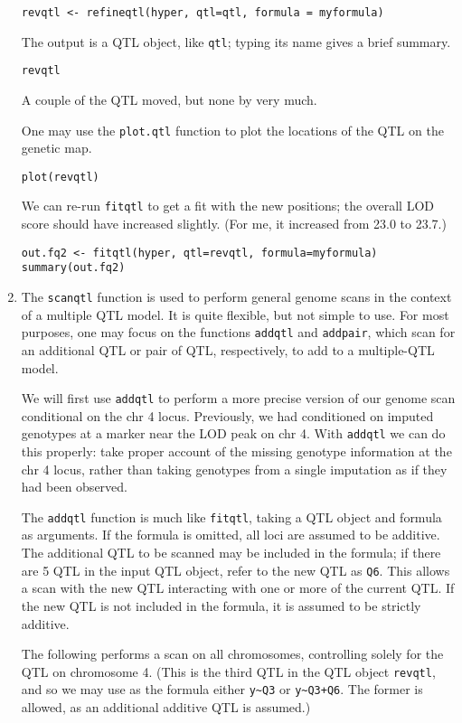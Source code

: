 \documentclass[10pt,letterpaper]{article}
\newcommand{\usercolor}{\color [named]{BlueViolet}}
\begin{document}
\begin{enumerate}
\usercolor
\verb|revqtl <- refineqtl(hyper, qtl=qtl, formula = myformula)|
\normalcolor

The output is a QTL object, like \verb-qtl-; typing its name gives a
brief summary.  

\usercolor \verb|revqtl| \normalcolor

A couple of the QTL moved, but none by very much.

One may use the \verb-plot.qtl- function to plot the
locations of the QTL on the genetic map.

\usercolor \verb|plot(revqtl)| \normalcolor

We can re-run \verb-fitqtl- to get a fit with the new positions; the
overall LOD score should have increased slightly.  (For me, it
increased from 23.0 to 23.7.)

\usercolor
\verb|out.fq2 <- fitqtl(hyper, qtl=revqtl, formula=myformula)| \\
\verb|summary(out.fq2)|
\normalcolor

\item The \verb-scanqtl- function is used to perform general genome
  scans in the context of a multiple QTL model.  It is quite flexible,
  but not simple to use.  For most purposes, one may focus on the
  functions \verb-addqtl- and \verb-addpair-, which scan for an
  additional QTL or pair of QTL, respectively, to add to a
  multiple-QTL model.

  We will first use \verb-addqtl- to perform a more precise version of
  our genome scan conditional on the chr 4 locus.  Previously, we had
  conditioned on imputed genotypes at a marker near the LOD peak on
  chr 4.  With \verb-addqtl- we can do this properly: take proper
  account of the missing genotype information at the chr 4 locus,
  rather than taking genotypes from a single imputation as if they had
  been observed.

  The \verb-addqtl- function is much like \verb-fitqtl-, taking a QTL
  object and formula as arguments.  If the formula is omitted,
  all loci are assumed to be additive.  The additional QTL to be
  scanned may be included in the formula; if there are 5 QTL in the
  input QTL object, refer to the new QTL as \verb-Q6-.  This allows a
  scan with the new QTL interacting with one or more of the current
  QTL.  If the new QTL is not included in the formula, it is assumed
  to be strictly additive.

  The following performs a scan on all chromosomes, controlling solely
  for the QTL on chromosome 4.  (This is the third QTL in the QTL
  object \verb-revqtl-, and so we may use as the formula either
  \verb-y~Q3- or \verb-y~Q3+Q6-.  The former is allowed, as an
  additional additive QTL is assumed.)


\end{enumerate}
\end{document}
